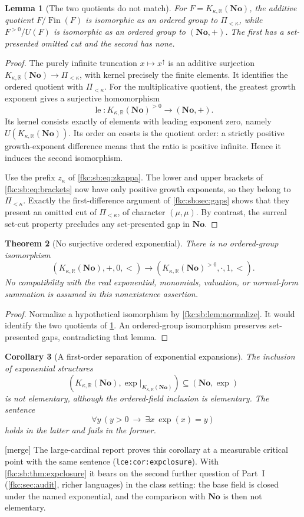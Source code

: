 \documentclass[11pt,letterpaper]{article}
\numberwithin{equation}{section}
\newtheorem{theorem}{Theorem}[section]
\newtheorem{lemma}[theorem]{Lemma}
\newtheorem{corollary}[theorem]{Corollary}
\theoremstyle{definition}
\theoremstyle{remark}
\newcommand{\R}{\mathbb R}
\newcommand{\No}{\mathbf{No}}
\newcommand{\mergetag}{\textup{\textsf{\small[merge]}}}%
\newcommand{\Fin}{\operatorname{Fin}}
\newcommand{\lead}{\operatorname{le}}
\newcommand{\KN}[2]{K_{#1,#2}(\No)}%
\newcommand{\Pk}{\Pi_{<\kappa}}
\newcommand{\lbl}[1]{\nolinkurl{#1}}%
\begin{document}
\begin{lemma}[The two quotients do not match]\label{fkc:sb:lem:quotientmismatch}
For $F=\KN\kappa\R$, the additive quotient $F/\Fin(F)$ is isomorphic as an ordered group to $\Pk$, while $F^{>0}/U(F)$ is isomorphic as an ordered group to $(\No,+)$. The first has a set-presented omitted cut and the second has none.
\end{lemma}
\begin{proof}
The purely infinite truncation $x\mapsto x^\uparrow$ is an additive surjection $\KN\kappa\R\to\Pk$, with kernel precisely the finite elements. It identifies the ordered quotient with $\Pk$. For the multiplicative quotient, the greatest growth exponent gives a surjective homomorphism
\[
 \lead:\KN\kappa\R^{>0}\longrightarrow(\No,+).
\]
Its kernel consists exactly of elements with leading exponent zero, namely $U(\KN\kappa\R)$. Its order on cosets is the quotient order: a strictly positive growth-exponent difference means that the ratio is positive infinite. Hence it induces the second isomorphism.

Use the prefix $z_\kappa$ of \eqref{fkc:sb:eq:zkappa}. The lower and upper brackets of \eqref{fkc:sb:eq:brackets} now have only positive growth exponents, so they belong to $\Pk$. Exactly the first-difference argument of \cref{fkc:sb:sec:gaps} shows that they present an omitted cut of $\Pk$, of character $(\mu,\mu)$. By contrast, the surreal set-cut property precludes any set-presented gap in $\No$.
\end{proof}

\begin{theorem}[No surjective ordered exponential]\label{fkc:sb:thm:noexp}
There is no ordered-group isomorphism
\[
 (\KN\kappa\R,+,0,<)\longrightarrow(\KN\kappa\R^{>0},\cdot,1,<).
\]
No compatibility with the real exponential, monomials, valuation, or normal-form summation is assumed in this nonexistence assertion.
\end{theorem}
\begin{proof}
Normalize a hypothetical isomorphism by \cref{fkc:sb:lem:normalize}. It would identify the two quotients of \cref{fkc:sb:lem:quotientmismatch}. An ordered-group isomorphism preserves set-presented gaps, contradicting that lemma.
\end{proof}

\begin{corollary}[A first-order separation of exponential expansions]\label{fkc:sb:cor:expsep}
The inclusion of exponential structures
\[
 (\KN\kappa\R,\exp|_{\KN\kappa\R})\subseteq(\No,\exp)
\]
is not elementary, although the ordered-field inclusion is elementary. The sentence
\[
 \forall y\,(y>0\ \longrightarrow\ \exists x\ \exp(x)=y)
\]
holds in the latter and fails in the former.
\end{corollary}
\mergetag{} The large-cardinal report proves this corollary at a measurable critical point with the same sentence (\lbl{lce:cor:expclosure}). With \cref{fkc:sb:thm:expclosure} it bears on the second further question of Part~I (\cref{fkc:sec:audit}, richer languages) in the class setting: the base field is closed under the named exponential, and the comparison with $\No$ is then not elementary.
\end{document}
